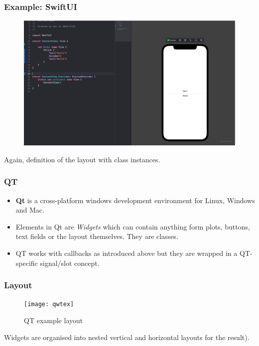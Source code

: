 \documentclass[xcolor=dvipsnames]{beamer}
\begin{document}
  
\begin{frame}[fragile]
  \frametitle{Example: SwiftUI}
\begin{figure}[!hbt]
\begin{center}
\mbox{\includegraphics[width=\textwidth]{swiftui}}
\end{center}
\end{figure}
Again, definition of the layout with class instances.
\end{frame}



  

\begin{frame}[fragile]
  \frametitle{QT}

  \begin{itemize}
\item \textbf{Qt} is a cross-platform windows development environment for
Linux, Windows and Mac.

\item Elements in Qt are \textsl{Widgets} which can contain anything form
  plots, buttons, text fields or the layout themselves. They are classes.
  
\item QT works with callbacks as introduced above
but they are wrapped in a QT-specific signal/slot concept.
\end{itemize}
\end{frame}
  



\begin{frame}[fragile]
  \frametitle{Layout}

\begin{figure}[!hbt]
\begin{center}
\mbox{\texttt{[image: qwtex]}}
\end{center}
\caption{QT example layout
\label{qwtex}}
\end{figure}

Widgets are organised into
nested vertical and horizontal layouts
for the result).
\end{frame}
\end{document}
